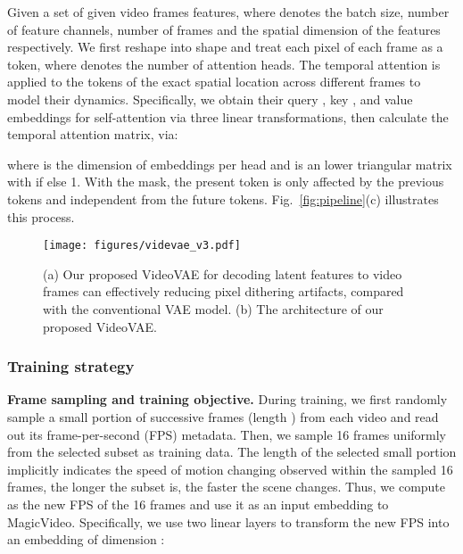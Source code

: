 \documentclass[10pt,twocolumn,letterpaper]{article}
\newcommand{\myPara}[1]{\vspace{6pt}\noindent\textbf{#1}}
\begin{document}
Given a set of given video frames features,  where  denotes the batch size, number of feature channels, number of frames and the spatial dimension of the features respectively. We first reshape  into shape  and treat each pixel of each frame as a token, where   denotes the number of attention heads.
The temporal attention is applied to the tokens of the exact spatial location across different frames to model their dynamics. 
Specifically,  we obtain their query , key , and value  embeddings for self-attention via three linear transformations, then calculate the temporal attention  matrix,  via:

where  is the dimension of   embeddings per head and  is an lower triangular  matrix with     if  else 1. With the   mask, the present token is only affected by the previous tokens and independent from the future tokens. Fig.~\ref{fig:pipeline}(c) illustrates this process.
  


\begin{figure}[t]
\small
\centering
    \begin{minipage}{1.02\linewidth}
        \centering
        \texttt{[image: figures/videvae\_v3.pdf]}
    \end{minipage}\hfill
\caption{{(a) Our proposed VideoVAE for decoding latent features to video frames can effectively  reducing pixel dithering artifacts, compared with the conventional VAE model. (b) The architecture of our proposed VideoVAE. }
\vspace{-3mm}
}
\label{fig:videovae}
\end{figure}




\subsubsection{Training strategy}
\label{subsubsec:sampling}
\myPara{Frame sampling and training objective.}
During training, we first randomly sample a small portion of successive frames (length )  from each video and read out its frame-per-second (FPS) metadata. Then, we sample 16 frames uniformly from the selected subset as training data. The length of the selected small portion implicitly indicates the speed of motion changing observed within the sampled 16 frames, \ie the longer the subset is, the faster the scene changes. Thus, we compute  as the new FPS of the 16 frames and use it as an input embedding to MagicVideo. Specifically, we  use two linear layers to transform the new FPS   into an embedding of dimension :
\end{document}
